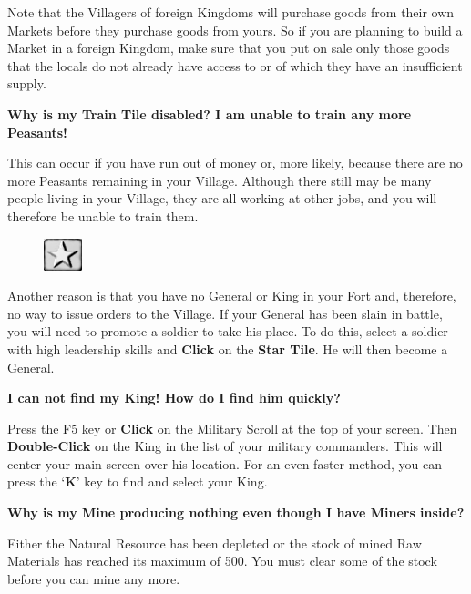 Note that the Villagers of foreign Kingdoms will purchase goods from their own Markets before they purchase goods from yours. So if you are planning to build a Market in a foreign Kingdom, make sure that you put on sale only those goods that the locals do not already have access to or of which they have an insufficient supply.

{\large \textbf{\textsf{Why is my Train Tile disabled? I am unable to train any more Peasants!}}}

This can occur if you have run out of money or, more likely, because there are no more Peasants remaining in your Village. Although there still may be many people living in your Village, they are all working at other jobs, and you will therefore be unable to train them.

\begin{figure}
    \vspace{-20pt}
    \begin{center}
        \includegraphics[width=0.1\textwidth]{Tstar}
    \end{center}
    \vspace{-20pt}
\end{figure}


Another reason is that you have no General or King in your Fort and, therefore, no way to issue orders to the Village. If your General has been slain in battle, you will need to promote a soldier to take his place. To do this, select a soldier with high leadership skills and \textbf{Click} on the \textbf{Star Tile}. He will then become a General.

{\large \textbf{\textsf{I can not find my King! How do I find him quickly?}}}


Press the F5 key or \textbf{Click} on the Military Scroll at the top of your screen. Then \textbf{Double-Click} on the King in the list of your military commanders. This will center your main screen over his location. For an even faster method, you can press the ‘\textbf{K}’ key to find and select your King.

{\large \textbf{\textsf{Why is my Mine producing nothing even though I have Miners inside?}}}

Either the Natural Resource has been depleted or the stock of mined Raw Materials has reached its maximum of 500. You must clear some of the stock before you can mine any more.


